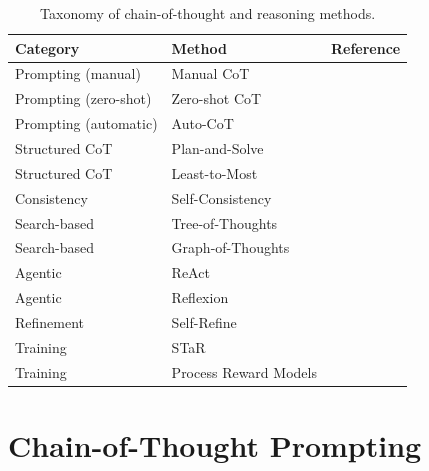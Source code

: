 \documentclass[11pt,a4paper]{article}
\begin{document}
\begin{table}[ht]
\centering
\caption{Taxonomy of chain-of-thought and reasoning methods.}
\label{tab:taxonomy}
\small
\begin{tabular}{lll}
\toprule
\textbf{Category} & \textbf{Method} & \textbf{Reference} \\
\midrule
Prompting (manual) & Manual CoT & \citep{wei2022chain} \\
Prompting (zero-shot) & Zero-shot CoT & \citep{kojima2022large} \\
Prompting (automatic) & Auto-CoT & \citep{zhang2022automatic} \\
Structured CoT & Plan-and-Solve & \citep{wang2023plan} \\
Structured CoT & Least-to-Most & \citep{zhou2022least} \\
Consistency & Self-Consistency & \citep{wang2022self} \\
Search-based & Tree-of-Thoughts & \citep{yao2023tree} \\
Search-based & Graph-of-Thoughts & \citep{besta2024graph} \\
Agentic & ReAct & \citep{yao2023react} \\
Agentic & Reflexion & \citep{shinn2023reflexion} \\
Refinement & Self-Refine & \citep{madaan2023self} \\
Training & STaR & \citep{zelikman2022star} \\
Training & Process Reward Models & \citep{lightman2023let} \\
\bottomrule
\end{tabular}
\end{table}

\section{Chain-of-Thought Prompting}
\label{sec:cot}
\end{document}
